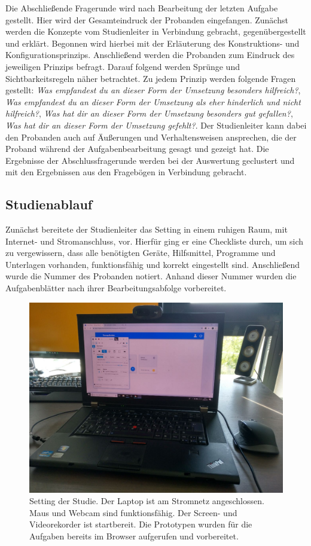 Die Abschließende Fragerunde wird nach Bearbeitung der letzten Aufgabe gestellt. Hier wird der Gesamteindruck der Probanden eingefangen. Zunächst werden die Konzepte vom Studienleiter in Verbindung gebracht, gegenübergestellt und erklärt. Begonnen wird hierbei mit der Erläuterung des Konstruktions- und Konfigurationsprinzips. Anschließend werden die Probanden zum Eindruck des jeweiligen Prinzips befragt. Darauf folgend werden Sprünge und Sichtbarkeitsregeln näher betrachtet. Zu jedem Prinzip werden folgende Fragen gestellt: \emph{Was empfandest du an dieser Form der Umsetzung besonders hilfreich?}, \emph{Was empfandest du an dieser Form der Umsetzung als eher hinderlich und nicht hilfreich?}, \emph{Was hat dir an dieser Form der Umsetzung besonders gut gefallen?}, \emph{Was hat dir an dieser Form der Umsetzung gefehlt?}. Der Studienleiter kann dabei den Probanden auch auf Äußerungen und Verhaltensweisen ansprechen, die der Proband während der Aufgabenbearbeitung gesagt und gezeigt hat. Die Ergebnisse der Abschlussfragerunde werden bei der Auswertung geclustert und mit den Ergebnissen aus den Fragebögen in Verbindung gebracht. 

\subsection{Studienablauf}
Zunächst bereitete der Studienleiter das Setting in einem ruhigen Raum, mit Internet- und Stromanschluss, vor. Hierfür ging er eine Checkliste durch, um sich zu vergewissern, dass alle benötigten Geräte, Hilfsmittel, Programme und Unterlagen vorhanden, funktionsfähig und korrekt eingestellt sind. Anschließend wurde die Nummer des Probanden notiert. Anhand dieser Nummer wurden die Aufgabenblätter nach ihrer Bearbeitungsabfolge vorbereitet.

\begin{figure}[h]
\centering
\includegraphics[width=1\textwidth]{pictures/setting}
\caption{Setting der Studie. Der Laptop ist am Stromnetz angeschlossen. Maus und Webcam sind funktionsfähig. Der Screen- und Videorekorder ist startbereit. Die Prototypen wurden für die Aufgaben bereits im Browser aufgerufen und vorbereitet.}
\label{counterbalancing}
\end{figure}

